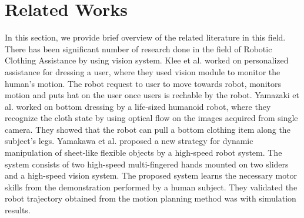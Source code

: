 \documentclass[sigconf]{acmart}
\begin{document}
\section{Related Works}
\label{sec:related_works}
In this section, we provide brief overview of the related literature in this field. There has been significant number of research done in the field of Robotic Clothing Assistance by using vision system. Klee et al. \cite{klee2015personalized} worked on personalized assistance for dressing a user, where they used vision module to monitor the human's motion. The robot request to user to move towards robot, monitors motion and puts hat on the user once users is rechable by the robot. Yamazaki et al. \cite{yamazaki2013method, yamazaki2014bottom}  worked on bottom dressing by a life-sized humanoid robot, where they recognize the cloth state by using  optical flow on the images acquired from single camera. They showed that the robot can pull a bottom clothing item along the subject's legs. Yamakawa et al. \cite{yamakawa2011dynamic} proposed a new strategy for dynamic manipulation of sheet-like flexible objects by a high-speed robot system. The system consists of two high-speed multi-fingered hands mounted on two sliders and a high-speed vision system. The proposed system learns the necessary motor skills from the demonstration performed by a human subject. They validated the robot trajectory obtained from the motion planning method was with simulation results.
\end{document}
